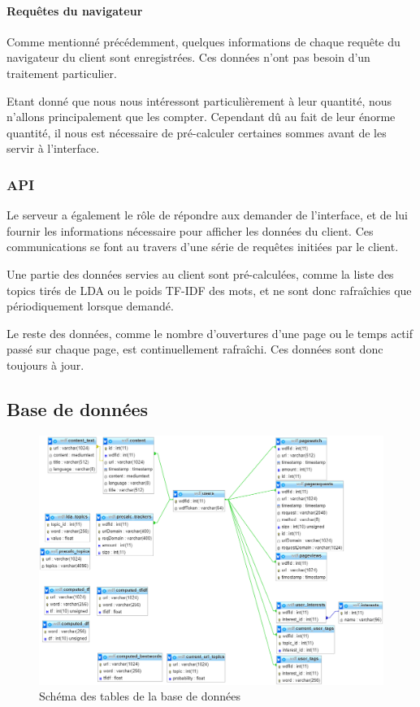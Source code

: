 			\paragraph{Requêtes du navigateur}

				Comme mentionné précédemment, quelques informations de chaque requête du navigateur du client sont enregistrées. Ces données n'ont pas besoin d'un traitement particulier.

				Etant donné que nous nous intéressont particulièrement à leur quantité, nous n'allons principalement que les compter. Cependant dû au fait de leur énorme quantité, il nous est nécessaire de pré-calculer certaines sommes avant de les servir à l'interface.

		\subsubsection{API}

			Le serveur a également le rôle de répondre aux demander de l'interface, et de lui fournir les informations nécessaire pour afficher les données du client. Ces communications se font au travers d'une série de requêtes initiées par le client.

			Une partie des données servies au client sont pré-calculées, comme la liste des topics tirés de LDA ou le poids TF-IDF des mots, et ne sont donc rafraîchies que périodiquement lorsque demandé.

			Le reste des données, comme le nombre d'ouvertures d'une page ou le temps actif passé sur chaque page, est continuellement rafraîchi. Ces données sont donc toujours à jour.

	\subsection{Base de données}

		\begin{figure}[!h]
			\centering
			\includegraphics[height=0.85\textwidth]{images/design/db}
			\caption{Schéma des tables de la base de données}
			\label{db}
		\end{figure}

